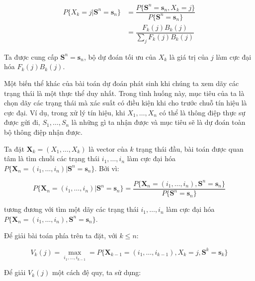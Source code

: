 \documentclass[14pt, a4paper]{article}
\numberwithin{equation}{section}
\numberwithin{figure}{section}
\theoremstyle{sltheorem}
\theoremstyle{soltheorem}
\numberwithin{dl}{section}
\numberwithin{md}{section}
\numberwithin{vd}{section}
\begin{document}
    \begin{equation*}
        \begin{aligned}
            P \lbrace X_k = j \vert \mathbf{S}^n = \mathbf{s}_n \rbrace &= \dfrac{P \lbrace \mathbf{S}^n = \mathbf{s}_n, X_k = j \rbrace}{P \lbrace \mathbf{S}^n = \mathbf{s}_n \rbrace} \\
            &= \dfrac{F_k (j) B_k (j)}{\sum_j F_k (j) B_k (j)}
        \end{aligned}
    \end{equation*}

    Ta được cung cấp $\mathbf{S}^n = \mathbf{s}_n$, bộ dự đoán tối ưu của $X_k$ là giá trị của $j$ làm cực đại hóa $F_k(j)B_k(j)$.

    Một biến thể khác của bài toán dự đoán phát sinh khi chúng ta xem dãy các trạng thái là một thực thể duy nhất.
    Trong tình huống này, mục tiêu của ta là chọn dãy các trạng thái mà xác suất có điều kiện khi cho trước chuỗ tín hiệu là cực đại.
    Ví dụ, trong xử lý tín hiệu, khi $X_1, \dots, X_n$ có thể là thông điệp thực sự được gửi đi, $S_1, \dots, S_n$ là những gì ta nhận được và mục tiêu sẽ là dự đoán toàn bộ thông điệp nhận được.

    Ta đặt $\mathbf{X}_k = (X_1, \dots, X_k)$ là vector của $k$ trạng thái đầu, bài toán được quan tâm là tìm chuỗi các trạng thái $i_1, \dots, i_n$ làm cực đại hóa $P \lbrace \mathbf{X}_n = (i_1, \dots, i_n) \vert \mathbf{S}^n = \mathbf{s}_n \rbrace$.
    Bởi vì:

    \begin{equation*}
        P \lbrace \mathbf{X}_n = (i_1, \dots, i_n) \vert \mathbf{S}^n = \mathbf{s}_n \rbrace = \dfrac{P \lbrace \mathbf{X}_n = (i_1, \dots, i_n), \mathbf{S}^n = \mathbf{s}_n \rbrace}{P \lbrace \mathbf{S}^n = \mathbf{s}_n \rbrace}
    \end{equation*}

    tương đương với tìm một dãy các trạng thái $i_1, \dots, i_n$ làm cực đại hóa $P \lbrace \mathbf{X}_n = (i_1, \dots, i_n), \mathbf{S}^n = \mathbf{s}_n \rbrace$.

    Để giải bài toán phía trên ta đặt, với $k \leq n$:

    \begin{equation*}
        V_k(j) = \max_{i_1, \dots, i_{k-1}} = P \lbrace \mathbf{X}_{k-1} = (i_1, \dots, i_{k-1}), X_k = j, \mathbf{S}^k = \mathbf{s}_k \rbrace
    \end{equation*}

    Để giải $V_k(j)$ một cách đệ quy, ta sử dụng:
\end{document}

